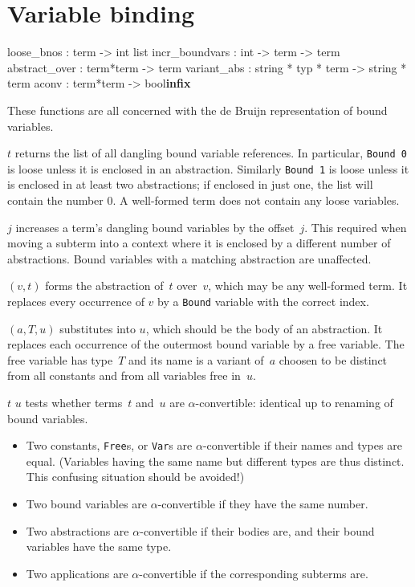 \section{Variable binding}
\begin{ttbox}
loose_bnos     : term -> int list
incr_boundvars : int -> term -> term
abstract_over  : term*term -> term
variant_abs    : string * typ * term -> string * term
aconv          : term*term -> bool\hfill{\bf infix}
\end{ttbox}
These functions are all concerned with the de Bruijn representation of
bound variables.
\begin{ttdescription}
\item[\ttindexbold{loose_bnos} $t$] 
  returns the list of all dangling bound variable references.  In
  particular, {\tt Bound~0} is loose unless it is enclosed in an
  abstraction.  Similarly {\tt Bound~1} is loose unless it is enclosed in
  at least two abstractions; if enclosed in just one, the list will contain
  the number 0.  A well-formed term does not contain any loose variables.

\item[\ttindexbold{incr_boundvars} $j$] 
  increases a term's dangling bound variables by the offset~$j$.  This
  required when moving a subterm into a context where it is enclosed by a
  different number of abstractions.  Bound variables with a matching
  abstraction are unaffected.

\item[\ttindexbold{abstract_over} $(v,t)$] 
  forms the abstraction of~$t$ over~$v$, which may be any well-formed term.
  It replaces every occurrence of \(v\) by a {\tt Bound} variable with the
  correct index.

\item[\ttindexbold{variant_abs} $(a,T,u)$] 
  substitutes into $u$, which should be the body of an abstraction.
  It replaces each occurrence of the outermost bound variable by a free
  variable.  The free variable has type~$T$ and its name is a variant
  of~$a$ choosen to be distinct from all constants and from all variables
  free in~$u$.

\item[$t$ \ttindexbold{aconv} $u$] 
  tests whether terms~$t$ and~$u$ are \(\alpha\)-convertible: identical up
  to renaming of bound variables.
\begin{itemize}
  \item
    Two constants, {\tt Free}s, or {\tt Var}s are \(\alpha\)-convertible
    if their names and types are equal.
    (Variables having the same name but different types are thus distinct.
    This confusing situation should be avoided!)
  \item
    Two bound variables are \(\alpha\)-convertible
    if they have the same number.
  \item
    Two abstractions are \(\alpha\)-convertible
    if their bodies are, and their bound variables have the same type.
  \item
    Two applications are \(\alpha\)-convertible
    if the corresponding subterms are.
\end{itemize}

\end{ttdescription}


